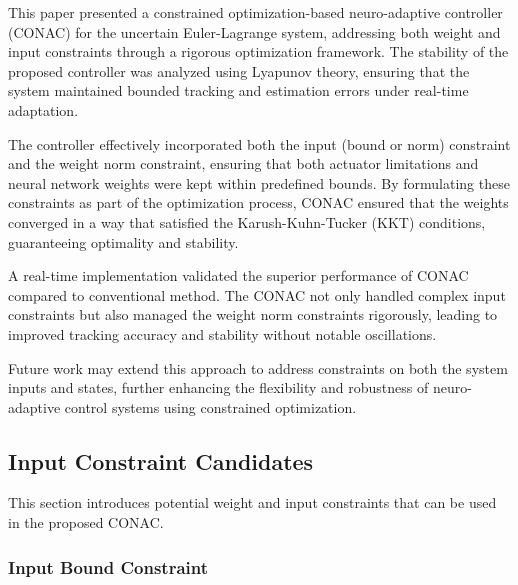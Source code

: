 \documentclass[lettersize,journal]{IEEEtran}
\begin{document}
This paper presented a constrained optimization-based neuro-adaptive controller (CONAC) for the uncertain Euler-Lagrange system, addressing both weight and input constraints through a rigorous optimization framework. 
The stability of the proposed controller was analyzed using Lyapunov theory, ensuring that the system maintained bounded tracking and estimation errors under real-time adaptation.

The controller effectively incorporated both the input (bound or norm) constraint and the weight norm constraint, ensuring that both actuator limitations and neural network weights were kept within predefined bounds. 
By formulating these constraints as part of the optimization process, CONAC ensured that the weights converged in a way that satisfied the Karush-Kuhn-Tucker (KKT) conditions, guaranteeing optimality and stability.

A real-time implementation validated the superior performance of CONAC compared to conventional method. 
The CONAC not only handled complex input constraints but also managed the weight norm constraints rigorously, leading to improved tracking accuracy and stability without notable oscillations.

Future work may extend this approach to address constraints on both the system inputs and states, further enhancing the flexibility and robustness of neuro-adaptive control systems using constrained optimization.

\appendix

\subsection{Input Constraint Candidates}\label{sec:appen:cstr} 

This section introduces potential weight and input constraints that can be used in the proposed CONAC. 

\subsubsection{Input Bound Constraint}\label{sec:appen:cstr:input:bound}
\end{document}
